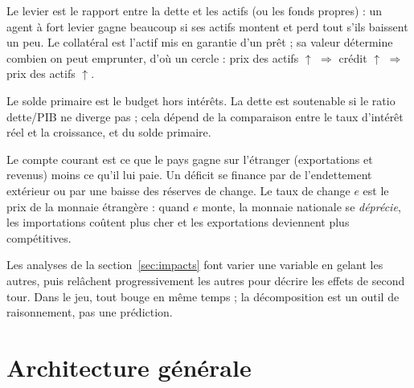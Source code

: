 \documentclass[11pt,a4paper]{article}
\newcommand{\up}{$\uparrow$}
\begin{document}
\begin{description}[style=nextline,leftmargin=1.2em]
\item[Levier et collatéral.] Le levier est le rapport entre la dette et les actifs (ou les fonds propres) : un agent à fort levier gagne beaucoup si ses actifs montent et perd tout s'ils baissent un peu. Le collatéral est l'actif mis en garantie d'un prêt ; sa valeur détermine combien on peut emprunter, d'où un cercle : prix des actifs \up{} $\Rightarrow$ crédit \up{} $\Rightarrow$ prix des actifs \up.
\item[Solde primaire et soutenabilité.] Le solde primaire est le budget hors intérêts. La dette est soutenable si le ratio dette/PIB ne diverge pas ; cela dépend de la comparaison entre le taux d'intérêt réel et la croissance, et du solde primaire.
\item[Balance commerciale, compte courant, change.] Le compte courant est ce que le pays gagne sur l'étranger (exportations et revenus) moins ce qu'il lui paie. Un déficit se finance par de l'endettement extérieur ou par une baisse des réserves de change. Le taux de change $e$ est le prix de la monnaie étrangère : quand $e$ monte, la monnaie nationale se \emph{déprécie}, les importations coûtent plus cher et les exportations deviennent plus compétitives.
\item[Toutes choses égales par ailleurs.] Les analyses de la section~\ref{sec:impacts} font varier une variable en gelant les autres, puis relâchent progressivement les autres pour décrire les effets de second tour. Dans le jeu, tout bouge en même temps ; la décomposition est un outil de raisonnement, pas une prédiction.
\end{description}

\section{Architecture générale}
\end{document}
